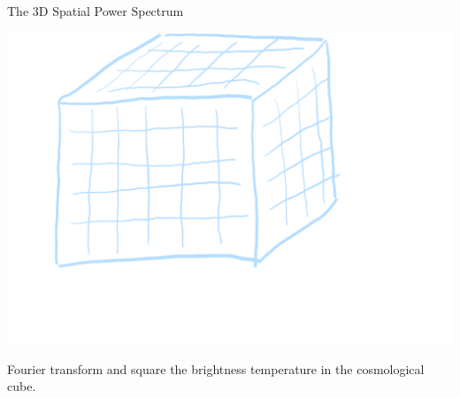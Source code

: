 \documentclass{beamer}
\begin{document}
\begin{frame}{The 3D Spatial Power Spectrum}
    \begin{center}
        \includegraphics[height=0.5\textheight]{figures/cube}
    \end{center}
    Fourier transform and square the brightness temperature in the cosmological cube.
\end{frame}

\end{document}
